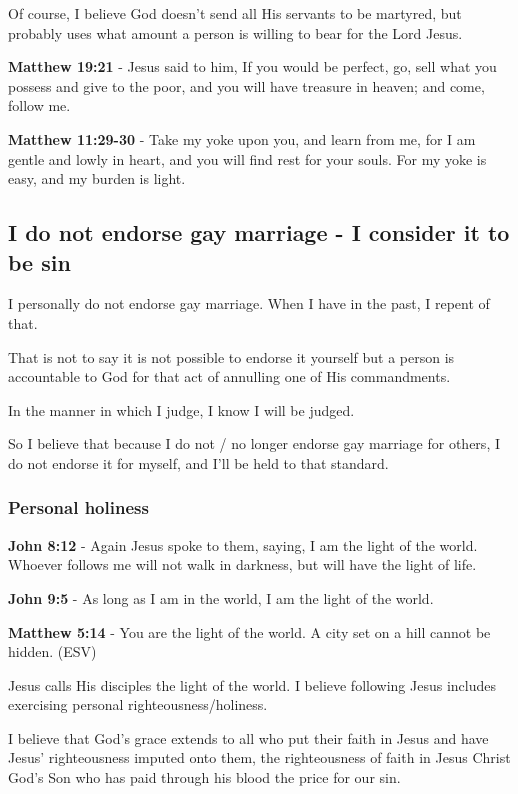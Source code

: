 \documentclass[11pt]{article}
\begin{document}
Of course, I believe God doesn't send all His servants to be martyred, but probably uses what amount a person is willing to bear for the Lord Jesus.

\textbf{Matthew 19:21} - Jesus said to him, If you would be perfect, go, sell what you possess and give to the poor, and you will have treasure in heaven; and come, follow me.

\textbf{Matthew 11:29-30} - Take my yoke upon you, and learn from me, for I am gentle and lowly in heart, and you will find rest for your souls. For my yoke is easy, and my burden is light.

\subsection{I do not endorse gay marriage - I consider it to be sin}
\label{sec:orgf8acb89}
I personally do not endorse gay marriage. When I have in the past, I repent of that.

That is not to say it is not possible to
endorse it yourself but a person is
accountable to God for that act of annulling
one of His commandments.

In the manner in which I judge, I know I will
be judged.

So I believe that because I do not / no longer
endorse gay marriage for others, I do not
endorse it for myself, and I'll be held to
that standard.

\subsubsection{Personal holiness}
\label{sec:orgc8076dd}
\textbf{John 8:12} - Again Jesus spoke to them, saying, I am the light of the world. Whoever follows me will not walk in darkness, but will have the light of life.

\textbf{John 9:5} - As long as I am in the world, I am the light of the world.

\textbf{Matthew 5:14} - You are the light of the world. A city set on a hill cannot be hidden. (ESV)

Jesus calls His disciples the light of the world.
I believe following Jesus includes exercising personal righteousness/holiness.

I believe that God's grace extends to all who
put their faith in Jesus and have Jesus'
righteousness imputed onto them, the
righteousness of faith in Jesus Christ God's
Son who has paid through his blood the price
for our sin.
\end{document}

